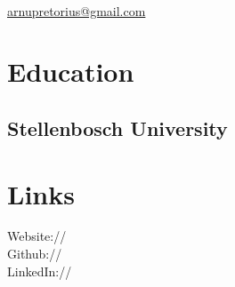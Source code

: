 \documentclass[]{deedy-resume-openfont}
\begin{document}
 \\
\href{mailto:arnupretorius@gmail.com}{arnupretorius@gmail.com}


%
%

\begin{minipage}[t]{0.33\textwidth} 


\section{Education} 

\subsection{Stellenbosch University}
\sectionsep

\sectionsep


\sectionsep

\sectionsep



\section{Links} 
Website://  \href{https://za.linkedin.com/in/arnupretorius}{} \\
Github:// \href{https://github.com/arnupretorius}{} \\
LinkedIn://  \href{https://za.linkedin.com/in/arnupretorius}{} \\



\end{minipage}
\end{document}
